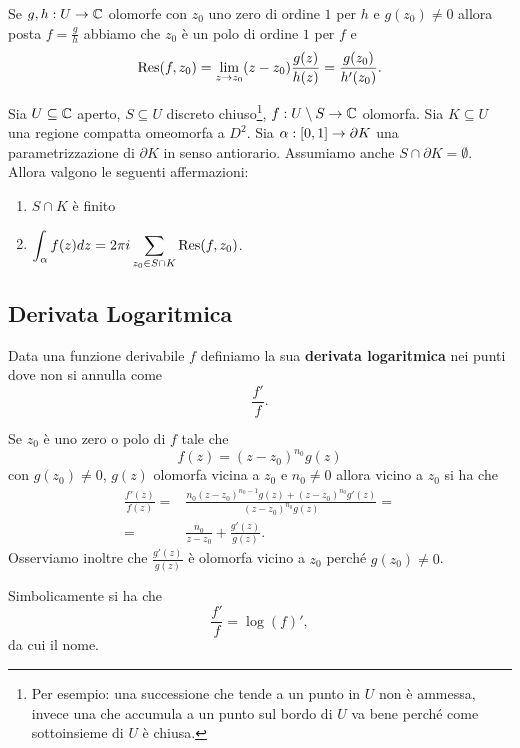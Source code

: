 \begin{multicols*}{2}
\begin{proposition}\label{FormulaResiduoPerRapportoDiOlomorfe}
Se $g,h:U\to \mathbb{C}$ olomorfe con $z_0$ uno zero di ordine $1$ per $h$ e $g(z_0)\neq 0$ allora posta $f=\frac gh$ abbiamo che $z_0$ \`e un polo di ordine $1$ per $f$ e
\[\mathrm{Res}(f,z_0)=\lim_{z\to z_0}(z-z_0)\frac{g(z)}{h(z)}=\frac{g(z_0)}{h'(z_0)}.\]
\end{proposition}

\begin{theorem}\label{TeoremaResidui}
Sia $U\subseteq \mathbb{C}$ aperto, $S\subseteq U$ discreto chiuso\footnote{Per esempio: una successione che tende a un punto in $U$ non \`e ammessa, invece una che accumula a un punto sul bordo di $U$ va bene perch\'e come sottoinsieme di $U$ \`e chiusa.}, $f:U\setminus S\to \mathbb{C}$ olomorfa. Sia $K\subseteq U$ una regione compatta omeomorfa a $D^2$. Sia $\alpha:[0,1]\to\partial K$ una parametrizzazione di $\partial K$ in senso antiorario. Assumiamo anche $S\cap \partial K=\emptyset$. Allora valgono le seguenti affermazioni:
\begin{enumerate}[noitemsep]
\item $S\cap K$ \`e finito
\item $\displaystyle\int_\alpha f(z)dz=2\pi i\sum_{z_0\in S\cap K}\mathrm{Res}(f,z_0)$.
\end{enumerate}
\end{theorem}

\subsection{Derivata Logaritmica}
\begin{definition}
Data una funzione derivabile $f$ definiamo la sua \textbf{derivata logaritmica} nei punti dove non si annulla come
\[\frac{f'}f.\]
\end{definition}
\begin{remark}
Se $z_0$ \`e uno zero o polo di $f$ tale che
\[f(z)=(z-z_0)^{n_0}g(z)\]
con $g(z_0)\neq 0$, $g(z)$ olomorfa vicina a $z_0$ e $n_0\neq 0$ allora vicino a $z_0$ si ha che
\begin{align*}
\frac{f'(z)}{f(z)}=&\frac{n_0(z-z_0)^{n_0-1}g(z)+(z-z_0)^{n_0}g'(z)}{(z-z_0)^{n_0}g(z)}=\\
=&\frac{n_0}{z-z_0}+\frac{g'(z)}{g(z)}.
\end{align*}
Osserviamo inoltre che $\frac{g'(z)}{g(z)}$ \`e olomorfa vicino a $z_0$ perch\'e $g(z_0)\neq 0$.
\end{remark}
\begin{remark}
Simbolicamente si ha che
\[\frac{f'}{f}=\log(f)',\]
da cui il nome.
\end{remark}



\end{multicols*}
